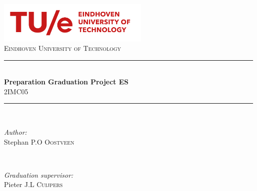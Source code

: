 \begin{titlepage}

\newcommand{\HRule}{\rule{\linewidth}{0.5mm}} %

\center %
 
\includegraphics[width=0.55\textwidth]{images/tuelogonew.png}\\[0.7cm]
\textsc{\LARGE Eindhoven University of Technology}\\[2.5cm] %


\HRule \\[0.4cm]
{ \huge \bfseries Preparation Graduation Project ES}\\[0.4cm] %
2IMC05
\HRule \\[2cm]
 

\begin{minipage}[t]{0.5\textwidth}
\begin{flushleft} \large
\emph{Author:}\\
Stephan P.O \textsc{Oostveen}\\
\end{flushleft}
\end{minipage}
~
\begin{minipage}[t]{0.39\textwidth}
\begin{flushright} \large
\emph{Graduation supervisor:} \\ 
Pieter J.L \textsc{Cuijpers}\\  %
\end{flushright}
\end{minipage}\\[4cm]


\end{titlepage}
